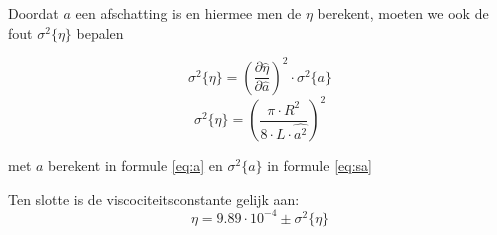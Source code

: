 Doordat $a$ een afschatting is en hiermee men de $\eta$ berekent,
moeten we ook de fout $\sigma ^2 \{ \eta \}$ bepalen

\begin{equation}
    \sigma ^2 \{ \eta \} = \left(\frac{\partial \hat{\eta}}{\partial \hat{a}}\right)^2 \cdot \sigma ^2 \{a\}
\end{equation}
\begin{equation*}
    \sigma ^2 \{ \eta \} = \left(\frac{\pi \cdot R^2}{8 \cdot L \cdot \hat{a^2}}\right)^2
\end{equation*}

met $a$ berekent in formule \eqref{eq:a} en $\sigma ^2 \{a\}$ in formule \eqref{eq:sa}

Ten slotte is de viscociteitsconstante gelijk aan:
\begin{equation*}
    \eta = 9.89 \cdot 10^{-4} \pm \sigma ^2 \{ \eta \}
\end{equation*}

